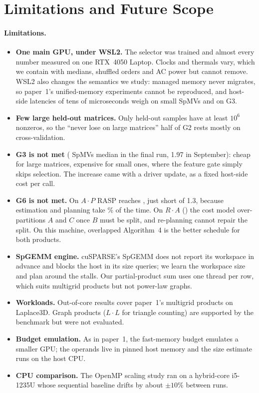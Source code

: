 \section{Limitations and Future Scope}\label{sec:limitations}

\paragraph{Limitations.}
\begin{itemize}
\item \textbf{One main GPU, under WSL2.} The selector was trained and almost every number measured on one RTX~4050
  Laptop. Clocks and thermals vary, which we contain with medians, shuffled orders and AC power but cannot remove.
  WSL2 also changes the semantics we study: managed memory never migrates, so paper~1's unified-memory experiments
  cannot be reproduced, and host-side latencies of tens of microseconds weigh on small SpMVs and on G3.
\item \textbf{Few large held-out matrices.} Only  held-out samples have at least $10^6$
  nonzeros, so the ``never lose on large matrices'' half of G2 rests mostly on cross-validation.
\item \textbf{G3 is not met} ( SpMVs median in the final run, 1.97 in September): cheap for large
  matrices, expensive for small ones, where the feature gate simply skips selection. The increase came with a driver
  update, as a fixed host-side cost per call.
\item \textbf{G6 is not met.} On $A\cdot P$ RASP reaches \x, just short of 1.3\x, because
  estimation and planning take \% of the time. On $R\cdot A$ (\x) the cost model
  over-partitions $A$ and $C$ once $B$ must be split, and re-planning cannot repair the split. On this machine, overlapped Algorithm~4 is the better schedule for both
  products.
\item \textbf{SpGEMM engine.} cuSPARSE's SpGEMM does not report its workspace in advance and blocks the host in its
  size queries; we learn the workspace size and plan around the stalls. Our partial-product sum uses one thread per
  row, which suits multigrid products but not power-law graphs.
\item \textbf{Workloads.} Out-of-core results cover paper~1's multigrid products on Laplace3D. Graph products
  ($L\cdot L$ for triangle counting) are supported by the benchmark but were not evaluated.
\item \textbf{Budget emulation.} As in paper~1, the fast-memory budget emulates a smaller GPU; the operands live in
  pinned host memory and the size estimate runs on the host CPU.
\item \textbf{CPU comparison.} The OpenMP scaling study ran on a hybrid-core i5-1235U whose sequential baseline drifts
  by about $\pm10\%$ between runs.
\end{itemize}

